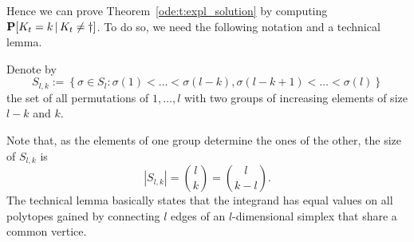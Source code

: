 \noindent
Hence we can prove Theorem~\ref{ode:t:expl_solution} by computing $\mathbf{P} \! \left[  K_t=k \, | \, K_t\neq \dagger  \right]$. To
do so, we need the following notation and a technical lemma.

\begin{Definition}
Denote by
\[ 
S_{l,k} := \left\{ \sigma \in S_l : 
	\sigma(1) < \ldots < \sigma(l-k), 
	\sigma(l-k+1) < \ldots < \sigma(l) 
	\right\}
\]
the set of all permutations of ${1,\ldots,l}$ with two groups of increasing elements of size
$l-k$ and $k$. 
\end{Definition}

\noindent
Note that, as the elements of one group determine the ones of the other, the size of $S_{l,k}$ is
\[ |S_{l,k}| = \binom{l}{k} = \binom{l}{k-l}. \]
The technical lemma basically states that the integrand has equal values on all polytopes gained by
connecting $l$ edges of an $l$-dimensional simplex that share a common vertice. 

